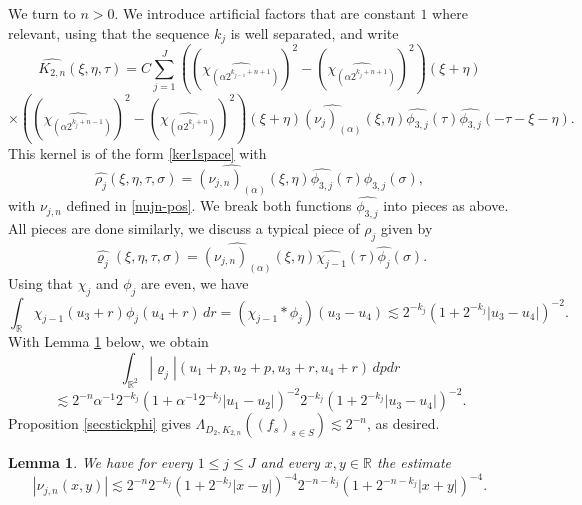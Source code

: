 \documentclass[12pt,reqno]{amsart}
\theoremstyle{plain}
\newtheorem{lemma}[theorem]{Lemma}
\theoremstyle{definition}
\numberwithin{equation}{section}
\newcommand{\R}{{\mathbb R}}
\begin{document}
We turn to $n>0$. We introduce  artificial factors 
that are constant $1$ where relevant, using that the sequence $k_j$ is well separated, and write
\[\widehat{K_{2,n}}(\xi,\eta,\tau) = C\sum_{j=1}^J ((\widehat{\chi_{(\alpha 2^{k_{j-1}+n+1})}})^2-(\widehat{\chi_{(\alpha 2^{k_{j}+n+1})}})^2)(\xi+\eta)  \]
\[\times 
((\widehat{\chi_{(\alpha 2^{k_{j}+n-1})}})^2-(\widehat{\chi_{(\alpha 2^{k_{j}+n})}})^2)(\xi+\eta)
\widehat{(\nu_j)_{(\alpha)}}(\xi,\eta)\widehat{\phi_{3,j}}(\tau)\widehat{\phi_{3,j}}(-\tau-\xi-\eta) .
\]
This kernel is of the form \eqref{ker1space} with
$$\widehat{\rho_j}(\xi,\eta,\tau, \sigma)=
\widehat{(\nu_{j,n})_{(\alpha)}}(\xi,\eta)\widehat{\phi_{3,j}}(\tau)\widehat{\phi_{3,j}}(\sigma),
$$
with $\nu_{j,n}$  defined in \eqref{nujn-pos}.
We break both functions $\widehat{\phi_{3,j}}$ into pieces as above.
All pieces are done similarly, we discuss a typical piece of $\rho_j$ given by
$$\widehat{\varrho_j}(\xi,\eta,\tau, \sigma)=
\widehat{(\nu_{j,n})_{(\alpha)}}(\xi,\eta)\widehat{\chi_{j-1}}(\tau)\widehat{\phi_{j}}(\sigma) .
$$
Using that $\chi_j$ and $\phi_j$ are even, we have
\[ \int_{\R} {\chi_{j-1}}(u_3+r){\phi_{j}}(u_4+r)\, dr=(\chi_{j-1}*\phi_j)(u_3-u_4)\lesssim 2^{-k_{j}}(1+2^{-k_{j}}|u_3-u_4|)^{-2}.
\]
With Lemma \ref{lemmadecay} below, we obtain
\[\int_{\R^2}|\varrho_j|(u_1+p,u_2+p,u_3+r,u_4+r)\, dpdr\]
\[\lesssim 2^{-n} \alpha^{-1} 2^{- k_{j}}(1+\alpha^{-1} 2^{- k_{j}} |u_1-u_2|)^{-2}
2^{-k_{j}}(1+2^{-k_{j}}|u_3-u_4|)^{-2}.\]
Proposition \ref{secstickphi} gives $\Lambda_{D_2,K_{2,n}}((f_s)_{s\in S})\lesssim 2^{-n}$, as desired.
 
 


\begin{lemma}\label{lemmadecay}
We have for every $1\le j\le J$ and every $x,y\in \R$ the estimate 
\[|\nu_{j,n}(x,y)|\lesssim 2^{-n} 2^{- k_j}(1+2^{- k_j}|x-y|)^{-4}2^{-n- k_{j}}(1+2^{-n- k_{j}} |x+y|)^{-4}. \]
\end{lemma}
\end{document}
